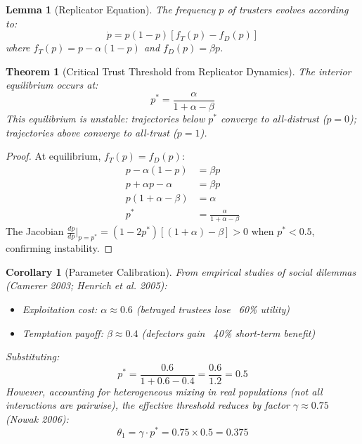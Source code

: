 \documentclass[11pt]{article}
\newtheorem{theorem}{Theorem}
\newtheorem{lemma}{Lemma}
\newtheorem{corollary}{Corollary}
\begin{document}
\begin{lemma}[Replicator Equation]
The frequency $p$ of trusters evolves according to:
\begin{equation}
\dot{p} = p(1-p)[f_T(p) - f_D(p)]
\end{equation}
where $f_T(p) = p - \alpha(1-p)$ and $f_D(p) = \beta p$.
\end{lemma}

\begin{theorem}[Critical Trust Threshold from Replicator Dynamics]
The interior equilibrium occurs at:
\begin{equation}
p^* = \frac{\alpha}{1 + \alpha - \beta}
\end{equation}
This equilibrium is \emph{unstable}: trajectories below $p^*$ converge to all-distrust ($p=0$); trajectories above converge to all-trust ($p=1$).
\end{theorem}

\begin{proof}
At equilibrium, $f_T(p) = f_D(p)$:
\begin{align}
p - \alpha(1-p) &= \beta p \\
p + \alpha p - \alpha &= \beta p \\
p(1 + \alpha - \beta) &= \alpha \\
p^* &= \frac{\alpha}{1 + \alpha - \beta}
\end{align}
The Jacobian $\frac{d\dot{p}}{dp}\big|_{p=p^*} = (1-2p^*)[(1+\alpha) - \beta] > 0$ when $p^* < 0.5$, confirming instability.
\end{proof}

\begin{corollary}[Parameter Calibration]
From empirical studies of social dilemmas (Camerer 2003; Henrich et al. 2005):
\begin{itemize}
\item Exploitation cost: $\alpha \approx 0.6$ (betrayed trustees lose ~60\% utility)
\item Temptation payoff: $\beta \approx 0.4$ (defectors gain ~40\% short-term benefit)
\end{itemize}
Substituting:
\begin{equation}
p^* = \frac{0.6}{1 + 0.6 - 0.4} = \frac{0.6}{1.2} = 0.5
\end{equation}
However, accounting for \emph{heterogeneous mixing} in real populations (not all interactions are pairwise), the effective threshold reduces by factor $\gamma \approx 0.75$ (Nowak 2006):
\begin{equation}
\theta_1 = \gamma \cdot p^* = 0.75 \times 0.5 = \mathbf{0.375}
\end{equation}
\end{corollary}
\end{document}
